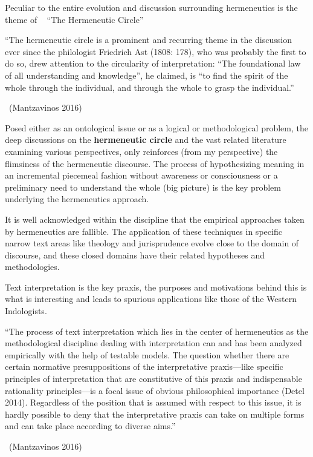 \smallskip

Peculiar to the entire evolution and discussion surrounding hermeneutics is the theme of   “The Hermeneutic Circle”

\smallskip

\begin{myquote}
“The hermeneutic circle is a prominent and recurring theme in the discussion ever since the philologist Friedrich Ast (1808: 178), who was probably the first to do so, drew attention to the circularity of interpretation: “The foundational law of all understanding and knowledge”, he claimed, is “to find the spirit of the whole through the individual, and through the whole to grasp the individual.”

~\hfill (Mantzavinos 2016)
\end{myquote}

\smallskip

Posed either as an ontological issue or as a logical or methodological problem, the deep discussions on the \textbf{hermeneutic circle} and the vast related literature examining various perspectives, only reinforces (from my perspective) the flimsiness of the hermeneutic discourse. The process of hypothesizing meaning in an incremental piecemeal fashion without awareness or consciousness or a preliminary need to understand the whole (big picture) is the key problem underlying the hermeneutics approach.

It is well acknowledged within the discipline that the empirical approaches taken by hermeneutics are fallible. The application of these techniques in specific narrow text areas like theology and jurisprudence evolve close to the domain of discourse, and these closed domains have their related hypotheses and methodologies.

Text interpretation is the key praxis, the purposes and motivations behind this is what is interesting and leads to spurious applications like those of the Western Indologists. 

\medskip

\begin{myquote}
“The process of text interpretation which lies in the center of hermeneutics as the methodological discipline dealing with interpretation can and has been analyzed empirically with the help of testable models. The question whether there are certain normative presuppositions of the interpretative praxis—like specific principles of interpretation that are constitutive of this praxis and indispensable rationality principles—is a focal issue of obvious philosophical importance (Detel 2014). Regardless of the position that is assumed with respect to this issue, it is hardly possible to deny that the interpretative praxis can take on multiple forms and can take place according to diverse aims.”

~\hfill (Mantzavinos 2016)
\end{myquote}


